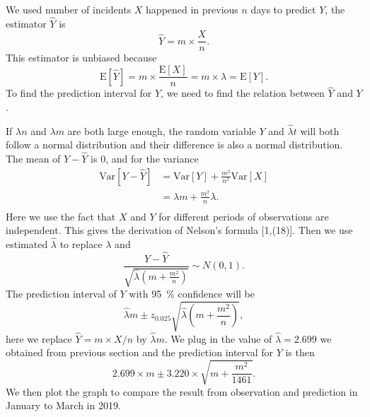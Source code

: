 \documentclass[11pt,a4paper,english]{article}
\begin{document}
We used number of incidents $X$ happened in previous $n$ days to predict $Y$, the estimator $\hat{Y}$ is 
\begin{equation*}
\hat{Y} = m \times \frac{X}{n}.
\end{equation*}
This estimator is unbiased because 
\begin{equation*}
	\text{E}[\hat{Y}] = m \times \frac{\text{E}[X]}{n} = m \times \lambda = \text{E}[Y].
\end{equation*}
To find the prediction interval for $Y$, we need to find the relation between $\hat{Y}$ and $Y$.

If $\lambda n$ and $\lambda m$ are both large enough, the random variable $Y$ and $\hat{\lambda}t$ will both follow a normal distribution and their difference is also a normal distribution.
The mean of $Y-\hat{Y}$ is $0$, and for the variance
\begin{align*}
	\text{Var}[Y-\hat{Y}] &= \text{Var}[Y]+\frac{m^{2}}{n^{2}}\text{Var}[X]\\
	&= \lambda m+\frac{m^{2}}{n}\lambda.\\
\end{align*}
Here we use the fact that $X$ and $Y$ for different periods of observations are independent.
This gives the derivation of Nelson's formula [1,(18)].
Then we use estimated $\hat{\lambda}$ to replace $\lambda$ and 
\begin{equation*}
	\frac{Y-\hat{Y}}{\sqrt{\hat{\lambda}\left(m+\frac{m^{2}}{n}\right)}} \sim N(0,1).
\end{equation*}
The prediction interval of $Y$ with \SI{95}{\percent} confidence will be 
\begin{equation*}
	\hat{\lambda}m \pm z_{0.025}\sqrt{\hat{\lambda}\left(m+\frac{m^{2}}{n}\right)},
\end{equation*}
here we replace $\hat{Y} = m \times X/n$ by $\hat{\lambda}m$. We plug in the value of $\hat{\lambda} = 2.699$ we obtained from previous section and the prediction interval for $Y$ is then 
\begin{equation*}
	2.699 \times m \pm 3.220 \times \sqrt{m+\frac{m^{2}}{1461}}.
\end{equation*} 
We then plot the graph to compare the result from observation and prediction in January to March in 2019. 

\end{document}
